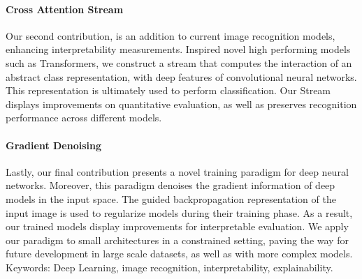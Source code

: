 \paragraph{Cross Attention Stream}  Our second contribution, is an addition to current image 
recognition models, enhancing interpretability measurements. Inspired novel high performing models 
such as Transformers, we construct a stream that computes the interaction of an abstract class 
representation, with deep features of convolutional neural networks. This representation is 
ultimately used to perform classification. Our Stream displays improvements on quantitative 
evaluation, as well as preserves recognition performance across different models.\\

\paragraph{Gradient Denoising} Lastly, our final contribution presents a novel training paradigm 
for deep neural networks. Moreover, this paradigm denoises the gradient information of deep models 
in the input space. The guided backpropagation representation of the input image is used to 
regularize models during their training phase. As a result, our trained models display improvements 
for interpretable evaluation. We apply our paradigm to small architectures in a constrained 
setting, paving the way for future development in large scale datasets, as well as with more 
complex models.\\

\vspace{0.5cm}
Keywords: Deep Learning, image recognition, interpretability, explainability.

